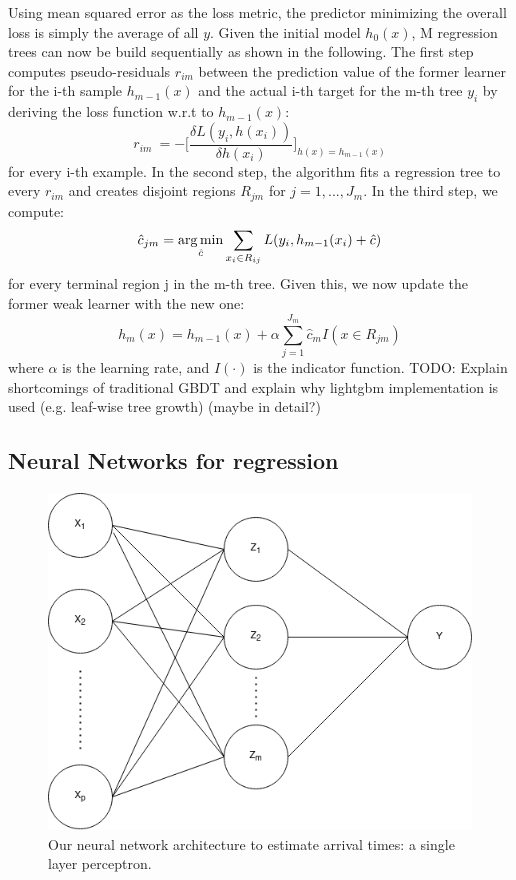 Using mean squared error as the loss metric, the predictor minimizing the overall loss is simply the average of all $ y $.
Given the initial model $ h_0(x) $, M regression trees can now be build sequentially as shown in the following. 
The first step computes pseudo-residuals $ r_{im} $ between the prediction value of the former learner for the i-th sample $ h_{m-1}(x) $ and the actual i-th target for the m-th tree $ y_i $ by deriving the loss function w.r.t to $ h_{m-1}(x) $: 
\begin{equation}
	r_{im}\ = - \bigg[\dfrac{\delta L(y_i, h(x_i))}{\delta h(x_i)}\bigg]_{h(x) = h_{m-1}(x)}
\end{equation} 
for every i-th example.
In the second step, the algorithm fits a regression tree to every $ r_{im} $ and creates disjoint regions $ R_{jm} $ for $j = 1, ..., J_m$. 
In the third step, we compute: 
\begin{equation}
	\hat{c}_{jm} = \operatorname*{arg\,min}_{\hat{c}} \sum_{x_i \in R_{ij}} L(y_i, h_{m-1}(x_i) + \hat{c})
\end{equation}
for every terminal region j in the m-th tree. 
Given this, we now update the former weak learner with the new one:
\begin{equation}
	h_m(x) = h_{m-1}(x) + \alpha \sum_{j=1}^{J_m} \hat{c}_{m}I(x \in R_{jm})
\end{equation}
where $ \alpha $ is the learning rate, and $ I(\cdot) $ is the indicator function.
\newline
\newline
TODO: Explain shortcomings of traditional GBDT and explain why lightgbm implementation is used (e.g. leaf-wise tree growth) (maybe in detail?)

\subsection{Neural Networks for regression}


\begin{figure}[h]
	\centering
	\includegraphics[width=0.5\linewidth]{../simplenn.png}
	\caption{Our neural network architecture to estimate arrival times: a single layer perceptron.}
	\label{fig:meine-grafik}
\end{figure}


